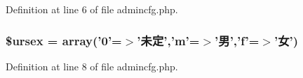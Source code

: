 Definition at line 6 of file admincfg.\+php.

\hypertarget{admincfg_8php_ad0eb94a4df3d6d75d937b2101361364b}{
\subsubsection[{\$ursex}]{\setlength{\rightskip}{0pt plus 5cm}\$ursex = array('0'=$>$'未定','m'=$>$'男','f'=$>$'女')}}\label{admincfg_8php_ad0eb94a4df3d6d75d937b2101361364b}


Definition at line 8 of file admincfg.\+php.

